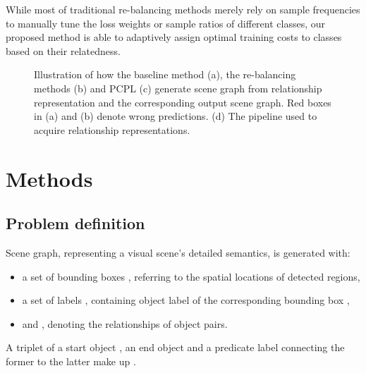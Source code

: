 \documentclass[sigconf]{acmart}
\begin{document}
While most of traditional re-balancing methods merely rely on sample frequencies to manually tune the loss weights or sample ratios of different classes, our proposed method is able to adaptively assign optimal training costs to classes based on their relatedness.
\begin{figure*}[htbp]
\centering
{}

\quad
{}\centering
\caption{Illustration of how the baseline method (a), the re-balancing methods (b) and PCPL (c) generate scene graph from relationship representation and the corresponding output scene graph. Red boxes in (a) and (b) denote wrong predictions. (d) The pipeline used to acquire relationship representations. }
\vspace{-0.2cm}
\label{fig:overall_framework}
\end{figure*}
\section{Methods}

\subsection{Problem definition}
Scene graph\cite{scene_graph}, representing a visual scene's detailed semantics, is generated with:
\begin{itemize}
    \item a set of bounding boxes , referring to the spatial locations of detected regions,
    \item a set of labels , containing object label  of the corresponding bounding box ,
    \item and , denoting the relationships of object pairs.
\end{itemize}
A triplet of a start object , an end object  and a predicate label  connecting the former to the latter make up .
\end{document}
